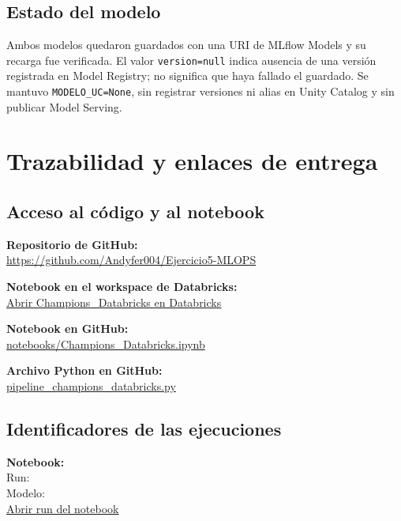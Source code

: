\documentclass[12pt,a4paper]{article}
\begin{document}
\subsection{Estado del modelo}
Ambos modelos quedaron guardados con una URI de MLflow Models y su recarga fue verificada. El valor \texttt{version=null} indica ausencia de una versión registrada en Model Registry; no significa que haya fallado el guardado. Se mantuvo \texttt{MODELO\_UC=None}, sin registrar versiones ni alias en Unity Catalog y sin publicar Model Serving.

\newpage
\section{Trazabilidad y enlaces de entrega}
\subsection{Acceso al código y al notebook}
\noindent\textbf{Repositorio de GitHub:}\\
\url{https://github.com/Andyfer004/Ejercicio5-MLOPS}

\noindent\textbf{Notebook en el workspace de Databricks:}\\
\href{https://dbc-5490c6a5-5215.cloud.databricks.com/editor/notebooks/2665096834519332?o=7474655525361249}{Abrir Champions\_Databricks en Databricks}

\noindent\textbf{Notebook en GitHub:}\\
\href{https://github.com/Andyfer004/Ejercicio5-MLOPS/blob/main/notebooks/Champions_Databricks.ipynb}{notebooks/Champions\_Databricks.ipynb}

\noindent\textbf{Archivo Python en GitHub:}\\
\href{https://github.com/Andyfer004/Ejercicio5-MLOPS/blob/main/pipeline_champions_databricks.py}{pipeline\_champions\_databricks.py}

\subsection{Identificadores de las ejecuciones}
\noindent\textbf{Notebook:}\\
Run: \\
Modelo: \\
\href{https://dbc-5490c6a5-5215.cloud.databricks.com/ml/experiments/2665096834519373/runs/bfe4871fb7324ad8953efb6bb7fa33cb?o=7474655525361249}{Abrir run del notebook}
\end{document}
